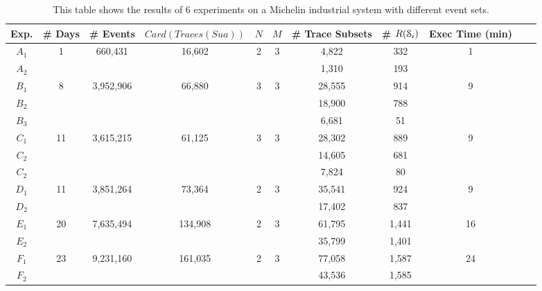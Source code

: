 \begin{table}
\begin{center}
\begin{tabular}{| c | c | c | c | c | c | c | c | c | c | c |}
\hline
Exp. & \# Days & \# Events & $Card(Traces(Sua))$ & $N$ & $M$ & \# Trace Subsets & \# $R(\EuScript{S}_i)$ & Exec Time (min)\\
\hline
\hline
$A_1$ & 1     & 660,431   & 16,602  & 2 & 3 & 4,822  & 332   & 1 \\
$A_2$ &       &           &         &   &   & 1,310  & 193   &   \\
\hline
$B_1$ & 8     & 3,952,906 & 66,880  & 3 & 3 & 28,555 & 914   & 9 \\
$B_2$ &       &           &         &   &   & 18,900 & 788   &   \\
$B_3$ &       &           &         &   &   &  6,681 &  51   &   \\
\hline
$C_1$ & 11    & 3,615,215 & 61,125  & 3 & 3 & 28,302 & 889   & 9 \\
$C_2$ &       &           &         &   &   & 14,605 & 681   &   \\
$C_2$ &       &           &         &   &   &  7,824 &  80   &   \\
\hline
$D_1$ & 11    & 3,851,264 & 73,364  & 2 & 3 & 35,541 & 924   & 9 \\
$D_2$ &       &           &         &   &   & 17,402 & 837   &   \\
\hline
$E_1$ & 20    & 7,635,494 & 134,908 & 2 & 3 & 61,795 & 1,441 & 16 \\
$E_2$ &       &           &         &   &   & 35,799 & 1,401 &    \\
\hline
$F_1$ & 23    & 9,231,160 & 161,035 & 2 & 3 & 77,058 & 1,587 & 24 \\
$F_2$ &       &           &         &   &   & 43,536 & 1,585 &    \\
\hline
\end{tabular}
\end{center}

\caption{This table shows the results of 6 experiments on a
Michelin industrial system with different event sets.}
\label{fig:results}
\end{table}

